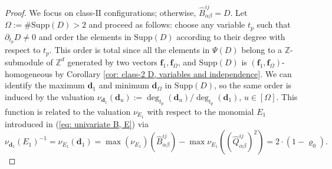 \documentclass[10pt]{article}
\theoremstyle{remark}%
\theoremstyle{definition}%
\begin{document}
\begin{proof}
We focus on class-$\mathrm{II}$ configurations; otherwise, $\hat{B}_{\alpha\beta}^{ij}=D$. 
Let $\Omega:=\#\mathrm{Supp}(D)>2$ and proceed as follows: 
choose any variable $t_{p}$ such that $\partial_{t_{p}}D\neq 0$ and order the elements in $\mathrm{Supp}(D)$ according to their degree with respect to $t_{p}$. This order is total since all the elements in $\Psi(D)$ belong to a $\mathbb{Z}$-submodule of $\mathbb{Z}^{d}$ generated by two vectors $\mathbf{f}_{1},\mathbf{f}_{\Omega}$, and $\mathrm{Supp}(D)$ is $(\mathbf{f}_{1},\mathbf{f}_{\Omega})$-homogeneous by Corollary \ref{cor: class-2 D, variables and independence}. We can identify the maximum $\mathbf{d}_{1}$ and minimum $\mathbf{d}_{\Omega}$ in $\mathrm{Supp}(D)$, so the same order is induced by the valuation $\nu_{\mathbf{d}_{1}}(\mathbf{d}_{u}):=\deg_{t_{p}}(\mathbf{d}_{u})/\deg_{t_{p}}(\mathbf{d}_{1})$, $u\in[\Omega]$. 
This function is related to the valuation $\nu_{E_{1}}$ with respect to the monomial $E_{1}$ introduced in (\ref{eq: univariate B, E}) via 
\begin{equation} 
\nu_{\mathbf{d}_{1}}(E_{1})^{-1} =\nu_{E_{1}}(\mathbf{d}_{1})=\max(\nu_{E_{1}})(\hat{B}_{\alpha\beta}^{ij})-\max\nu_{E_{1}}((\hat{Q}_{\alpha\beta}^{ij})^2)=2\cdot (1-\varrho_{0}).
\label{eq: relation between normalizations}
\end{equation}


\end{proof}
\end{document}
